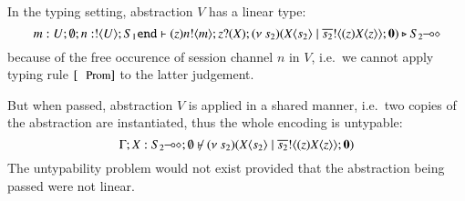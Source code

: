 \begin{example}
	\noi In the typing setting, abstraction $V$ has a linear type:
	\[
		m: U; \emptyset; n: ! \langle U \rangle ; S_1 \mathtt{end} \vdash
		(z) n ! \langle m \rangle ; z ? (X) ; (\nu\ s_2)(X\langle s_2 \rangle \;|\; \overline{s_2} ! \langle (z) X\langle z \rangle  \rangle ; \mathbf{0}) \triangleright
		S_2\!\! \multimap\!\! \diamond
	\]
	because of the free occurence of session channel $n$ in $V$,
	i.e.\ we cannot apply typing rule $\trule{Prom}$ to the latter
	judgement.

	\noi But when passed, abstraction $V$ is applied in a shared manner, i.e.\ two
	copies of the abstraction are instantiated, thus the whole
	encoding is untypable: 
	\[
		\Gamma; X: \lhot{S_2}; \es \not\proves \newsp{s_2}{\appl{X}{s_2} \Par \bout{\dual{s_2}}{(z) \appl{X}{z}} \inact}
	\]
%
	\noi The untypability problem would not exist
	provided that the abstraction being passed were not linear.


\end{example}
